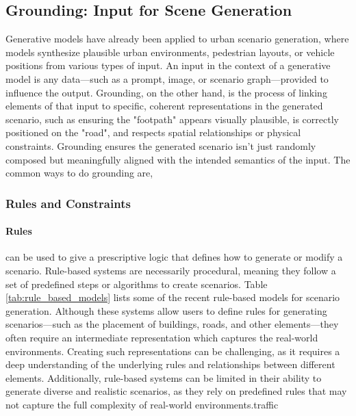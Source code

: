 \documentclass{article}
\begin{document}
\subsection{Grounding: Input for Scene Generation}

Generative models have already been applied to urban scenario generation, where models synthesize plausible urban environments, pedestrian layouts, or vehicle positions from various types of input. An input in the context of a generative model is any data—such as a prompt, image, or scenario graph—provided to influence the output. Grounding, on the other hand, is the process of linking elements of that input to specific, coherent representations in the generated scenario, such as ensuring the "footpath" appears visually plausible, is correctly positioned on the "road", and respects spatial relationships or physical constraints. Grounding ensures the generated scenario isn't just randomly composed but meaningfully aligned with the intended semantics of the input. The common ways to do grounding are,

\subsubsection{Rules and Constraints}

\paragraph{Rules} can be used to give a prescriptive logic that defines how to generate or modify a scenario. Rule-based systems are necessarily procedural, meaning they follow a set of predefined steps or algorithms to create scenarios. Table \ref{tab:rule_based_models} lists some of the recent rule-based models for scenario generation. Although these systems allow users to define rules for generating scenarios—such as the placement of buildings, roads, and other elements—they often require an intermediate representation which captures the real-world environments. Creating such representations can be challenging, as it requires a deep understanding of the underlying rules and relationships between different elements. Additionally, rule-based systems can be limited in their ability to generate diverse and realistic scenarios, as they rely on predefined rules that may not capture the full complexity of real-world environments.traffic
\end{document}
